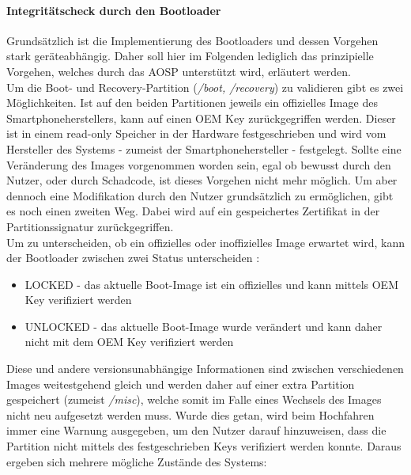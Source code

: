 	\paragraph{Integritätscheck durch den Bootloader}
	Grundsätzlich ist die Implementierung des Bootloaders und dessen Vorgehen stark
	geräteabhängig. Daher soll hier im Folgenden lediglich das prinzipielle
	Vorgehen, welches durch das AOSP unterstützt wird, erläutert werden.\\
	Um die Boot- und Recovery-Partition (\textit{/boot, /recovery}) zu validieren
	gibt es zwei Möglichkeiten. Ist auf den beiden Partitionen jeweils ein 
	offizielles Image des Smartphoneherstellers, kann auf einen OEM Key
	zurückgegriffen werden. Dieser ist in einem read-only Speicher in der Hardware
	festgeschrieben und wird vom Hersteller des Systems - zumeist der
	Smartphonehersteller - festgelegt. Sollte eine Veränderung des Images
	vorgenommen worden sein, egal ob bewusst durch den Nutzer, oder durch
	Schadcode, ist dieses Vorgehen nicht mehr möglich. Um aber dennoch eine
	Modifikation durch den Nutzer grundsätzlich zu ermöglichen, gibt es noch einen
	zweiten Weg. Dabei wird auf ein gespeichertes Zertifikat in der
	Partitionssignatur zurückgegriffen.\\
	Um zu unterscheiden, ob ein offizielles oder inoffizielles Image erwartet
	wird, kann der Bootloader zwischen zwei Status
	unterscheiden \cite{VerifiedBoot}:
	\begin{itemize}\itemsep0pt
		\item LOCKED - das aktuelle Boot-Image ist ein offizielles und kann mittels OEM Key verifiziert werden
		\item UNLOCKED - das aktuelle Boot-Image wurde verändert und kann daher nicht mit dem OEM Key verifiziert werden
	\end{itemize}
	Diese und andere versionsunabhängige Informationen sind zwischen
	verschiedenen Images weitestgehend gleich und werden daher auf einer extra
	Partition gespeichert (zumeist \textit{/misc}), welche somit im Falle eines
	Wechsels des Images nicht neu aufgesetzt werden muss.
	Wurde dies getan, wird beim Hochfahren immer eine Warnung ausgegeben, um den
	Nutzer darauf hinzuweisen, dass die Partition nicht mittels des
	festgeschrieben Keys verifiziert werden konnte. Daraus ergeben sich mehrere
	mögliche Zustände des Systems:

